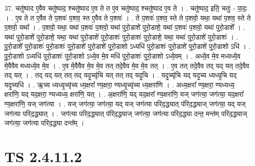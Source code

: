 \documentclass[17pt]{extarticle}
\begin{document}
37. चतु॑ष्पाद ए॒वैव चतु॑ष्पाद॒ श्चतु॑ष्पाद ए॒व ते त ए॒व चतु॑ष्पाद॒ श्चतु॑ष्पाद ए॒व ते । . चतु॑ष्पाद॒ इति॒ चतुः॑ - पा॒दः॒ । . ए॒व ते त ए॒वैव ते प॒शवः॑ प॒शव॒ स्त ए॒वैव ते प॒शवः॑ । . ते प॒शवः॑ प॒शव॒ स्ते ते प॒शवो॒ यथा॒ यथा॑ प॒शव॒ स्ते ते प॒शवो॒ यथा᳚ । . प॒शवो॒ यथा॒ यथा॑ प॒शवः॑ प॒शवो॒ यथा॑ पुरो॒डाशे॑ पुरो॒डाशे॒ यथा॑ प॒शवः॑ प॒शवो॒ यथा॑ पुरो॒डाशे᳚ । . यथा॑ पुरो॒डाशे॑ पुरो॒डाशे॒ यथा॒ यथा॑ पुरो॒डाशे॑ पुरो॒डाशः॑ पुरो॒डाशः॑ पुरो॒डाशे॒ यथा॒ यथा॑ पुरो॒डाशे॑ पुरो॒डाशः॑ । . पु॒रो॒डाशे॑ पुरो॒डाशः॑ पुरो॒डाशः॑ पुरो॒डाशे॑ पुरो॒डाशे॑ पुरो॒डाशो ऽध्यधि॑ पुरो॒डाशः॑ पुरो॒डाशे॑ पुरो॒डाशे॑ पुरो॒डाशो ऽधि॑ । . पु॒रो॒डाशो ऽध्यधि॑ पुरो॒डाशः॑ पुरो॒डाशो ऽध्ये॒व मे॒व मधि॑ पुरो॒डाशः॑ पुरो॒डाशो ऽध्ये॒वम् । . अध्ये॒व मे॒व मध्यध्ये॒व मे॒वैवैव मध्यध्ये॒व मे॒व । . ए॒व मे॒वैवैव मे॒व मे॒व तत् तदे॒वैव मे॒व मे॒व तत् । . ए॒व तत् तदे॒वैव तद् यद् यत् तदे॒वैव तद् यत् । . तद् यद् यत् तत् तद् यदृ॒च्यृ॑चि यत् तत् तद् यदृ॒चि । . यदृ॒च्यृ॑चि यद् यदृ॒च्य ध्यध्यृ॒चि यद् यदृ॒च्यधि॑ । . ऋ॒च्य ध्यध्यृ॒च्यृ॑च्य ध्य॒क्षरा᳚ ण्य॒क्षरा॒ ण्यध्यृ॒च्यृ॑च्य ध्य॒क्षरा॑णि । . अध्य॒क्षरा᳚ ण्य॒क्षरा॒ ण्यध्यध्य॒ क्षरा॑णि॒ यद् यद॒क्षरा॒ ण्यध्यध्य॒ क्षरा॑णि॒ यत् । . अ॒क्षरा॑णि॒ यद् यद॒क्षरा᳚ ण्य॒क्षरा॑णि॒ यज् जग॑त्या॒ जग॑त्या॒ यद॒क्षरा᳚ ण्य॒क्षरा॑णि॒ यज् जग॑त्या । . यज् जग॑त्या॒ जग॑त्या॒ यद् यज् जग॑त्या परिद॒द्ध्यात् प॑रिद॒द्ध्याज् जग॑त्या॒ यद् यज् जग॑त्या परिद॒द्ध्यात् । . जग॑त्या परिद॒द्ध्यात् प॑रिद॒द्ध्याज् जग॑त्या॒ जग॑त्या परिद॒द्ध्या दन्त॒ मन्त॑म् परिद॒द्ध्याज् जग॑त्या॒ जग॑त्या परिद॒द्ध्या दन्त᳚म् । \newline
\pagebreak
{}

\section{ TS 2.4.11.2 }
\end{document}

